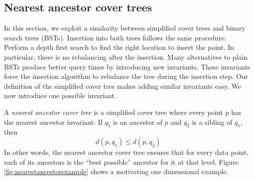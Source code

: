 \documentclass[../main.tex]{subfiles}
\begin{document}

\subsection{Nearest ancestor cover trees}

In this section, we exploit a similarity between simplified cover trees and binary search trees (BSTs).
Insertion into both trees follows the same procedure:
Perform a depth first search to find the right location to insert the point.
In particular, there is no rebalancing after the insertion.
Many alternatives to plain BSTs produce better query times by introducing new invariants.
These invariants force the insertion algorithm to rebalance the tree during the insertion step.
Our definition of the simplified cover tree makes adding similar invariants easy.
We now introduce one possible invariant.

A \emph{nearest ancestor cover tree} is a simplified cover tree where every point $p$ has the nearest ancestor invariant:
If $q_1$ is an ancestor of $p$ and $q_2$ is a sibling of $q_1$, then
$$
d(p,q_1) \le d(p,q_2)
$$
In other words, the nearest ancestor cover tree ensures that for every data point, each of its ancestors is the ``best possible'' ancestor for it at that level.
Figure \ref{fig:nearestancestorexample} shows a motivating one dimensional example.
\end{document}
